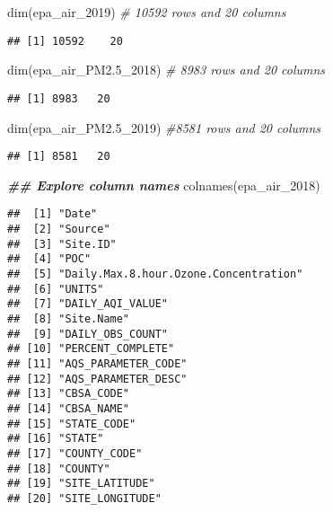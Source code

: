 \documentclass[
]{article}
\newenvironment{Shaded}{\begin{snugshade}}{\end{snugshade}}
\newcommand{\CommentTok}[1]{\textcolor[rgb]{0.56,0.35,0.01}{\textit{#1}}}
\newcommand{\DocumentationTok}[1]{\textcolor[rgb]{0.56,0.35,0.01}{\textbf{\textit{#1}}}}
\newcommand{\FloatTok}[1]{\textcolor[rgb]{0.00,0.00,0.81}{#1}}
\newcommand{\FunctionTok}[1]{\textcolor[rgb]{0.00,0.00,0.00}{#1}}
\newcommand{\NormalTok}[1]{#1}
\begin{document}
\begin{Shaded}
\begin{Highlighting}[]
\FunctionTok{dim}\NormalTok{(epa\_air\_2019) }\CommentTok{\# 10592 rows and 20 columns}
\end{Highlighting}
\end{Shaded}

\begin{verbatim}
## [1] 10592    20
\end{verbatim}

\begin{Shaded}
\begin{Highlighting}[]
\FunctionTok{dim}\NormalTok{(epa\_air\_PM2}\FloatTok{.5}\NormalTok{\_2018) }\CommentTok{\# 8983 rows and 20 columns}
\end{Highlighting}
\end{Shaded}

\begin{verbatim}
## [1] 8983   20
\end{verbatim}

\begin{Shaded}
\begin{Highlighting}[]
\FunctionTok{dim}\NormalTok{(epa\_air\_PM2}\FloatTok{.5}\NormalTok{\_2019) }\CommentTok{\#8581 rows and 20 columns}
\end{Highlighting}
\end{Shaded}

\begin{verbatim}
## [1] 8581   20
\end{verbatim}

\begin{Shaded}
\begin{Highlighting}[]
\DocumentationTok{\#\# Explore column names}
\FunctionTok{colnames}\NormalTok{(epa\_air\_2018)}
\end{Highlighting}
\end{Shaded}

\begin{verbatim}
##  [1] "Date"                                
##  [2] "Source"                              
##  [3] "Site.ID"                             
##  [4] "POC"                                 
##  [5] "Daily.Max.8.hour.Ozone.Concentration"
##  [6] "UNITS"                               
##  [7] "DAILY_AQI_VALUE"                     
##  [8] "Site.Name"                           
##  [9] "DAILY_OBS_COUNT"                     
## [10] "PERCENT_COMPLETE"                    
## [11] "AQS_PARAMETER_CODE"                  
## [12] "AQS_PARAMETER_DESC"                  
## [13] "CBSA_CODE"                           
## [14] "CBSA_NAME"                           
## [15] "STATE_CODE"                          
## [16] "STATE"                               
## [17] "COUNTY_CODE"                         
## [18] "COUNTY"                              
## [19] "SITE_LATITUDE"                       
## [20] "SITE_LONGITUDE"
\end{verbatim}
\end{document}
